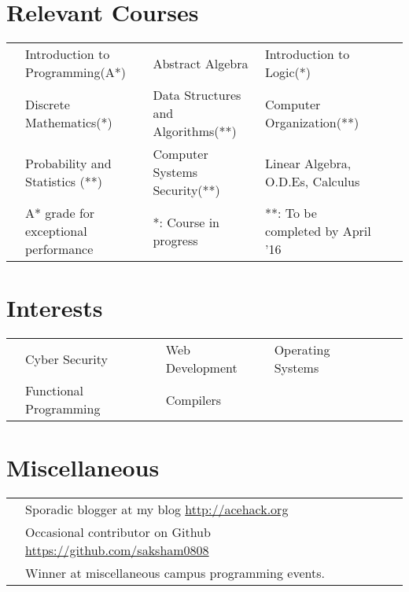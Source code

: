 \documentclass[11pt,a4paper]{article}
\begin{document}
\vspace{-0.6cm}
\section*{Relevant Courses}
\vspace{-0.3cm}
\begin{tabular}{L{0.05cm} L{5.8cm} L{6.5cm} L{7.5cm} L{8cm} L{13cm}}
& Introduction to Programming(A*)  & Abstract Algebra & Introduction to Logic(*)\\
& Discrete Mathematics(*)          & Data Structures and Algorithms(**) & Computer Organization(**)\\
& Probability and Statistics (**)  & Computer Systems Security(**) & Linear Algebra, O.D.Es, Calculus\\
  \vspace{0.3cm}
& \footnotesize{A* grade for exceptional performance}
& \footnotesize{*: Course in progress}
& \footnotesize{**: To be completed by April '16}
\end{tabular}

\vspace{-0.8cm}
\section*{Interests}
\vspace{-0.3cm}
\begin{tabular}{L{0.05cm} L{5.8cm} L{6.5cm} L{7.5cm} L{8cm} L{13cm}}
  & Cyber Security    & Web Development        & Operating Systems\\
  & Functional Programming & Compilers
\end{tabular}

\vspace{-0.5cm}
\section*{Miscellaneous}
\vspace{-0.3cm}
\begin{tabular}{L{0.05cm} l}
  & Sporadic blogger at my blog \url{http://acehack.org}\\
  & Occasional contributor on Github \url{https://github.com/saksham0808}\\
  & Winner at miscellaneous campus programming events.
\end{tabular}
\end{document}
